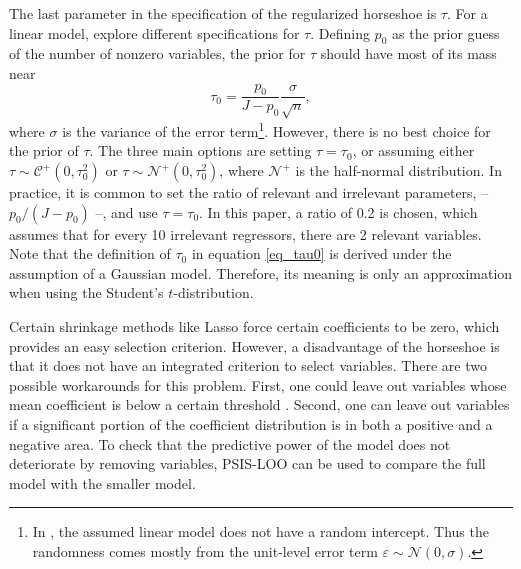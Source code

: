 The last parameter in the specification of the regularized horseshoe is $\tau$.
For a linear model, \cite{piironen_sparsity_2017} explore different specifications for $\tau$.
Defining $p_0$ as the prior guess of the number of nonzero variables, the prior for $\tau$ should have most of its mass near
\begin{equation}
    \displaystyle \tau_0 = \frac{p_0}{J-p_0}\frac{\sigma}{\sqrt n},
    \label{eq_tau0}
\end{equation}
where $\sigma$ is the variance of the error term\footnote{In \cite{piironen_sparsity_2017}, the assumed linear model does not have a random intercept. Thus the randomness comes mostly from the unit-level error term $\varepsilon \sim \mathcal N (0, \sigma)$.}.
However, there is no best choice for the prior of $\tau$. The three main options are setting $\tau = \tau_0$, or assuming either $\tau \sim \mathcal C^+(0, \tau_0^2)$ or $\tau \sim \mathcal N^+(0, \tau_0^2)$, where $\mathcal{N^+}$ is the half-normal distribution.
In practice, it is common to set the ratio of relevant and irrelevant parameters, – $p_0/(J - p_0)$ –, and use $\tau = \tau_0$.
In this paper, a ratio of 0.2 is chosen, which assumes that for every 10 irrelevant regressors, there are 2 relevant variables.
Note that the definition of $\tau_0$ in equation \ref{eq_tau0} is derived under the assumption of a Gaussian model.
Therefore, its meaning is only an approximation when using the Student's $t$-distribution.

Certain shrinkage methods like Lasso force certain coefficients to be zero, which provides an easy selection criterion.
However, a disadvantage of the horseshoe is that it does not have an integrated criterion to select variables. There are two possible workarounds for this problem.
First, one could leave out variables whose mean coefficient is below a certain threshold \citep{piironen_sparsity_2017}.
Second, one can leave out variables if a significant portion of the coefficient distribution is in both a positive and a negative area.
To check that the predictive power of the model does not deteriorate by removing variables, PSIS-LOO can be used to compare the full model with the smaller model.

